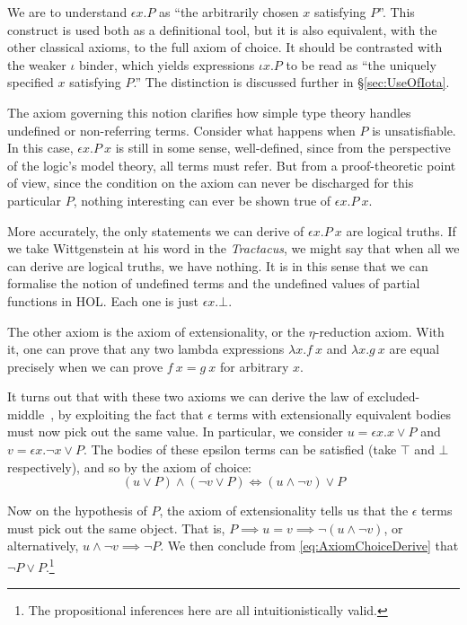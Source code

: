We are to understand $\epsilon x. P$ as ``the arbitrarily chosen $x$ satisfying $P$''. This construct is used both as a definitional tool, but it is also equivalent, with the other classical axioms, to the full axiom of choice. It should be contrasted with the weaker $\iota$ binder, which yields expressions $\iota x. P$ to be read as ``the uniquely specified $x$ satisfying $P$.'' The distinction is discussed further in \S\ref{sec:UseOfIota}.

The axiom governing this notion clarifies how simple type theory handles undefined or non-referring terms. Consider what happens when $P$ is unsatisfiable. In this case, $\epsilon x. P\ x$ is still in some sense, well-defined, since from the perspective of the logic's model theory, all terms must refer. But from a proof-theoretic point of view, since the condition on the axiom can never be discharged for this particular $P$, nothing interesting can ever be shown true of $\epsilon x. P\ x$.

More accurately, the only statements we can derive of $\epsilon x. P\ x$ are logical truths. If we take Wittgenstein at his word in the \emph{Tractacus}, we might say that when all we can derive are logical truths, we have nothing. It is in this sense that we can formalise the notion of undefined terms and the undefined values of partial functions in HOL. Each one is just $\epsilon x. \bot$.

The other axiom is the axiom of extensionality, or the $\eta$-reduction axiom. With it, one can prove that any two lambda expressions $\lambda x. f\ x$ and $\lambda x. g\ x$ are equal precisely when we can prove $f\ x = g\ x$ for arbitrary $x$.

It turns out that with these two axioms we can derive the law of excluded-middle~\cite{AxiomChoiceExcludedMiddle}, by exploiting the fact that $\epsilon$ terms with extensionally equivalent bodies must now pick out the same value. In particular, we consider $u = \epsilon x. x \vee P$ and $v = \epsilon x. \neg x \vee P$. The bodies of these epsilon terms can be satisfied (take $\top$ and $\bot$ respectively), and so by the axiom of choice:
\begin{equation}
  (u \vee P) \wedge (\neg v \vee P) \iff (u \wedge \neg v) \vee P \label{eq:AxiomChoiceDerive}
\end{equation}

Now on the hypothesis of $P$, the axiom of extensionality tells us that the $\epsilon$ terms must pick out the same object. That is, $P \implies u = v \implies \neg (u \wedge \neg v)$, or alternatively, $u \wedge \neg v \implies \neg P$. We then conclude from \eqref{eq:AxiomChoiceDerive} that $\neg P \vee P$.\footnote{The propositional inferences here are all intuitionistically valid.}

